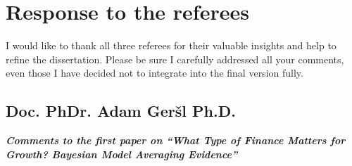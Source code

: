 \chapter{Response to the referees}
I would like to thank all three referees for their valuable insights and help to refine the dissertation. Please be sure I carefully addressed all your comments, even those I have decided not to integrate into the final version fully.

\section{Doc. PhDr. Adam Ger\v{s}l Ph.D.}

\textbf{\textit{Comments to the first paper on ``What Type of Finance Matters for Growth? Bayesian Model Averaging Evidence''}}




